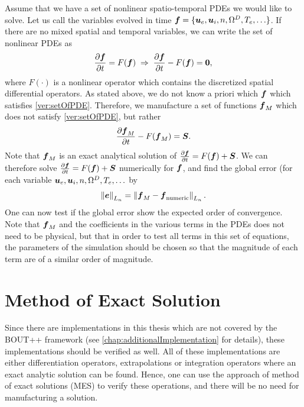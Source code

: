 Assume that we have a set of nonlinear spatio-temporal PDEs we would like to solve.
Let us call the variables evolved in time $\boldsymbol{f}=\{\boldsymbol{u}_e, \boldsymbol{u}_i, n, \Omega^D, T_e, \ldots\}$.
If there are no mixed spatial and temporal variables, we can write the set of nonlinear PDEs as
%
\begin{align}
    \frac{\partial {\boldsymbol{f}}}{\partial{t}} = F(\boldsymbol{f}) \; \Rightarrow \; \frac{\partial {\boldsymbol{f}}}{\partial{t}} - F(\boldsymbol{f}) = \boldsymbol{0},
  \label{ver:setOfPDE}
\end{align}
%
where $F(\cdot)$ is a nonlinear operator which contains the discretized spatial differential operators.
As stated above, we do not know a priori which $\boldsymbol{f}$ which satisfies \cref{ver:setOfPDE}.
Therefore, we manufacture a set of functions $\boldsymbol{f}_M$ which does not satisfy \cref{ver:setOfPDE}, but rather
%
\begin{align*}
    \frac{\partial {\boldsymbol{f}_M}}{\partial{t}} - F(\boldsymbol{f}_M) = \boldsymbol{S}.
\end{align*}
%
Note that $\boldsymbol{f}_M$ is an exact analytical solution of $\frac{\partial {\boldsymbol{f}}}{\partial{t}} = F(\boldsymbol{f}) + \boldsymbol{S}$.
We can therefore solve $\frac{\partial {\boldsymbol{f}}}{\partial{t}} = F(\boldsymbol{f}) + \boldsymbol{S}$  numerically for $\boldsymbol{f}$, and find the global error (for each variable $\boldsymbol{u}_e, \boldsymbol{u}_i, n, \Omega^D, T_e, \ldots$ by
%
\begin{align*}
    \left\|\boldsymbol{e}\right\|_{L_n} =
    \left\|\boldsymbol{f}_{M} - \boldsymbol{f}_{\text{numeric}}\right\|_{L_n}.
\end{align*}
%
One can now test if the global error show the expected order of convergence.
Note that $\boldsymbol{f}_M$ and the coefficients in the various terms in the PDEs does not need to be physical, but that in order to test all terms in this set of equations, the parameters of the simulation should be chosen so that the magnitude of each term are of a similar order of magnitude.

\section{Method of Exact Solution}
\label{sec:MES}
%
Since there are implementations in this thesis which are not covered by the BOUT++ framework (see \cref{chap:additionalImplementation} for details), these implementations should be verified as well.
All of these implementations are either differentiation operators, extrapolations or integration operators where an exact analytic solution can be found.
Hence, one can use the approach of method of exact solutions (MES) to verify these operations, and there will be no need for manufacturing a solution.

